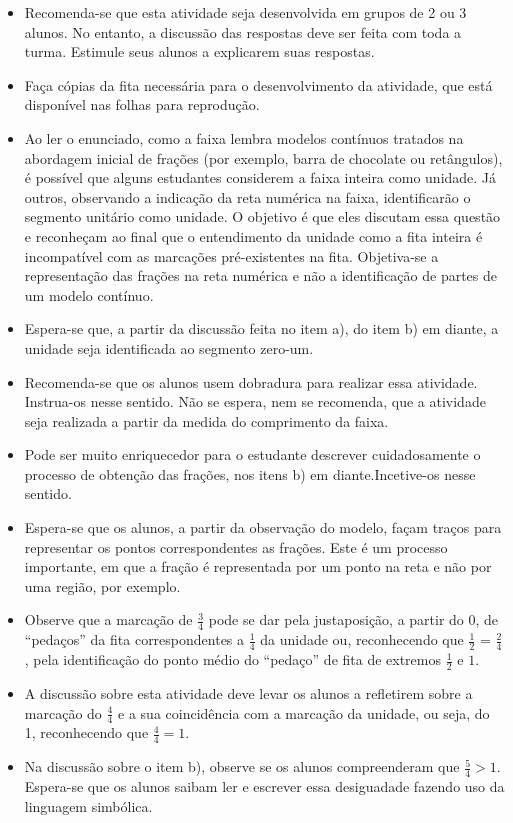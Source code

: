 \begin{multicols}{2}
      
\begin{itemize} %
    \item       Recomenda-se que esta atividade seja desenvolvida em grupos de 2 ou 3 alunos. No entanto, a discussão das respostas deve ser feita com toda a turma. Estimule seus alunos a explicarem suas respostas.
    \item       Faça cópias da fita necessária para o desenvolvimento da atividade, que está disponível nas folhas para reprodução.
    \item       Ao ler o enunciado, como a faixa lembra modelos contínuos tratados na abordagem inicial de frações (por exemplo, barra de chocolate ou retângulos), é possível que alguns estudantes considerem a faixa inteira como unidade. Já outros, observando a indicação da reta numérica na faixa, identificarão o segmento unitário como unidade. O objetivo é que eles discutam essa questão e reconheçam ao final que o entendimento da unidade como a fita inteira é incompatível com as marcações pré-existentes na fita. Objetiva-se a representação das frações na reta numérica e não a identificação de partes de um modelo contínuo. 
    \item       Espera-se que, a partir da discussão feita no item a), do item b) em diante, a unidade seja identificada ao segmento zero-um.
    \item       Recomenda-se que os alunos usem dobradura para realizar essa atividade. Instrua-os nesse sentido. Não se espera, nem se recomenda, que a atividade seja realizada a partir da medida do comprimento da faixa.
    \item       Pode ser muito enriquecedor para o estudante descrever cuidadosamente o processo de obtenção das frações, nos itens b) em diante.Incetive-os nesse sentido.
    \item       Espera-se que os alunos, a partir da observação do modelo, façam traços para representar os pontos correspondentes as frações. Este é um processo importante, em que a fração é representada por um ponto na reta e não por uma região, por exemplo. 
    \item       Observe que a marcação de       $\frac{3}{4}$       pode se dar pela justaposição, a partir do       $0$, de       ``pedaços''       da fita correspondentes a       $\frac{1}{4}$       da unidade ou, reconhecendo que       $\frac{1}{2}$       =       $\frac{2}{4}$, pela identificação do ponto médio do       ``pedaço''       de fita de extremos       $\frac{1}{2}$       e       $1$.    
    \item       A discussão sobre esta atividade deve levar os alunos a refletirem sobre a marcação do       $\frac{4}{4}$       e a sua coincidência com a marcação da unidade, ou seja, do 1, reconhecendo que       $\frac{4}{4}=1$. 
    \item       Na discussão sobre o item b), observe se os alunos compreenderam que       $\frac{5}{4}>1$. Espera-se que os alunos saibam ler e escrever essa desiguadade fazendo uso da linguagem simbólica.  
\end{itemize} %
  


\end{multicols}

